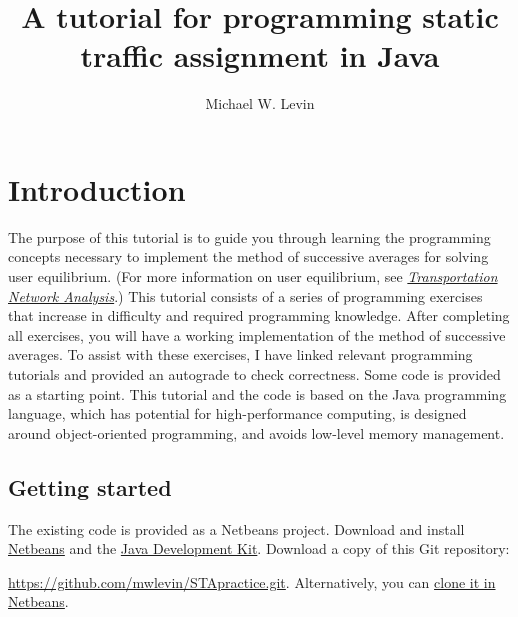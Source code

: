 \documentclass[11pt]{article}
\begin{document}
	\allowdisplaybreaks[1]
	
	
	\title{A tutorial for programming static traffic assignment in Java}
	
	\author{Michael W. Levin}
	
	\maketitle
	
\section{Introduction}

The purpose of this tutorial is to guide you through learning the programming concepts necessary to implement the method of successive averages for solving user equilibrium. (For more information on user equilibrium, see \href{https://sboyles.github.io/blubook.html}{\textit{Transportation Network Analysis}}.)
This tutorial consists of a series of programming exercises that increase in difficulty and required programming knowledge. After completing all exercises, you will have a working implementation of the method of successive averages. 
To assist with these exercises, I have linked relevant programming tutorials and provided an autograde to check correctness. Some code is provided as a starting point. 
This tutorial and the code is based on the Java programming language, which has potential for high-performance computing, is designed around object-oriented programming, and avoids low-level memory management.
%


\subsection{Getting started}
\label{sec11}

The existing code is provided as a Netbeans project. Download and install \href{https://netbeans.apache.org/download/index.html}{Netbeans} and the \href{https://openjdk.java.net/projects/jdk/12/}{Java Development Kit}. Download a copy of this Git repository:

\noindent \href{https://github.com/mwlevin/STApractice.git}{https://github.com/mwlevin/STApractice.git}. Alternatively, you can \href{https://netbeans.org/kb/docs/ide/git.html#clone}{clone it in Netbeans}.
\end{document}
